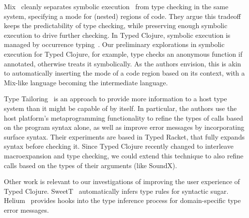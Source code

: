 \documentclass[11pt]{iuthesis}
\begin{document}
Mix~\cite{Khoo2010MTC} cleanly separates symbolic execution~\cite{King1976SEP} from type checking
in the same system, specifying a mode for (nested) regions of code.
They argue this tradeoff keeps the predictability of type checking, while preserving enough
symbolic execution to drive further checking.
In Typed Clojure, symbolic execution is managed by occurrence typing~\cite{TF10}.
Our preliminary explorations in symbolic execution for Typed Clojure, for example, type checks an
anonymous function if annotated, otherwise treats it symbolically.
As the authors envision, this is akin to automatically inserting
the mode of a code region based on its context, with a Mix-like language
becoming the intermediate language.

Type Tailoring~\cite{greenmanttailoring} is an approach to provide more information
to a host type system than it might be capable of by itself.
In particular, the authors use the host platform's metaprogramming functionality
to refine the types of calls based on the program syntax alone, as well as improve
error messages by incorporating surface syntax. Their experiments are based in Typed Racket, that fully expands
syntax before checking it. Since Typed Clojure recently changed to interleave macroexpansion
and type checking, we could extend this technique to also refine calls based on the
types of their arguments (like SoundX).


Other work is relevant to our investigations of improving the user experience
of Typed Clojure. SweetT~\cite{pombrio2018inferring} automatically infers type rules
for syntactic sugar. Helium~\cite{Heeren2003STI} provides hooks into the type inference
process for domain-specific type error messages.

\printbibliography


\newpage

\end{document}
